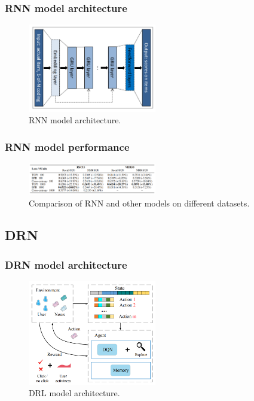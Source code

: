 \documentclass{ieeetj}
\begin{document}
\subsubsection{RNN model architecture}
\begin{figure}[h]
\centering
\includegraphics[width=0.5\textwidth]{figures/rnn-architecture.png}
\caption{RNN model architecture.}
\label{fig:rnn}
\end{figure}

\subsubsection{RNN model performance}
\begin{figure}[h]
	\centering
	\includegraphics[width=0.5\textwidth]{figures/rnn-performance.png}
	\caption{Comparison of RNN and other models on different datasets.}
	\label{fig:rnn-performance}
\end{figure}
\FloatBarrier
\subsection{DRN}
\subsubsection{DRN model architecture}
\begin{figure}[h]
\centering
\includegraphics[width=0.5\textwidth]{figures/drn-architecture.png}
\caption{DRL model architecture.}
\label{fig:drl}
\end{figure}
\end{document}

